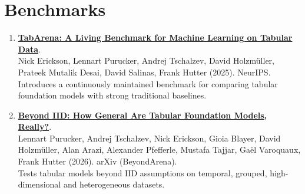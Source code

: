 \documentclass[9pt,a4paper]{extarticle}
\begin{document}
\section{Benchmarks}
\begin{enumerate}[resume]
\item \textbf{\href{https://arxiv.org/abs/2506.16791}{TabArena: A Living Benchmark for Machine Learning on Tabular Data}}.\\
Nick Erickson, Lennart Purucker, Andrej Tschalzev, David Holzm\"uller, Prateek Mutalik Desai, David Salinas, Frank Hutter (2025). NeurIPS.\\
 Introduces a continuously maintained benchmark for comparing tabular foundation models with strong traditional baselines.
\item \textbf{\href{https://arxiv.org/abs/2606.30410}{Beyond IID: How General Are Tabular Foundation Models, Really?}}.\\
Lennart Purucker, Andrej Tschalzev, Nick Erickson, Gioia Blayer, David Holzm\"uller, Alan Arazi, Alexander Pfefferle, Mustafa Tajjar, Gaël Varoquaux, Frank Hutter (2026). arXiv (BeyondArena).\\
 Tests tabular models beyond IID assumptions on temporal, grouped, high-dimensional and heterogeneous datasets.
\end{enumerate}
\end{document}

